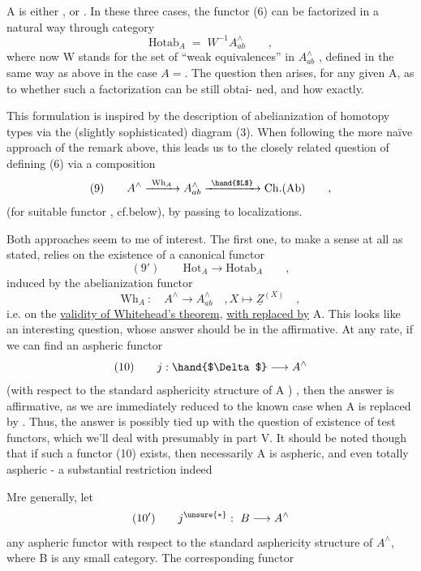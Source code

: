 
A  is either \hand{$\square$} , or \hand{$\bigcirc$} .  In these three cases,  the functor (6) can
be  factorized in a natural way through  category
\[ \mathrm{Hotab}_A \;=\; W^{-1}A^{\wedge}_{ab} \qquad , \]
where now W stands for the set of ``weak equivalences'' in  $A^{\wedge}_{ab}$ ,  defined
in the same way as above in the case $A=$\hand{$\Delta$}.  The question then arises,
for any given A,  as to whether such a factorization can be still obtai-%
ned,  and how exactly.

This formulation is inspired by the description of abelianization
of homotopy types via the (slightly sophisticated) diagram (3).  When
following the more naïve approach of the remark above,  this leads us to
the closely related question of defining (6)  via a composition
\[ (9) \qquad A^{\wedge} \xrightarrow{\ \mathrm{Wh}_A\ } A^{\wedge}_{ab} \xrightarrow{\ \hand{$L$}\ } \mathrm{Ch.(Ab)} \qquad , \]
(for suitable functor  , cf.below),  by passing to localizations.

Both approaches seem to me of interest.  The first one,  to make a
sense at all as stated,  relies on the existence of a canonical functor
\[ (9') \qquad \mathrm{Hot}_A \longrightarrow \mathrm{Hotab}_A \qquad , \]
induced by the abelianization functor
\[ \mathrm{Wh}_A \ : \quad A^{\wedge} \longrightarrow A^{\wedge}_{ab} \quad ,X \longmapsto \underline{Z}^{(X)} \quad , \]
i.e.  on the \uline{validity of Whitehead's theorem},  \uline{with \hand{$\Delta$} replaced by} A.
This looks like an interesting question,  whose answer should be in the
affirmative.  At any rate,  if we can find an aspheric functor
\[ (10) \qquad j: \hand{$\Delta$} \longrightarrow A^{\wedge} \]
(with respect to the standard asphericity structure of A )
  ,  then the answer is affirmative,  as we are
immediately reduced to the known case when A is replaced by \hand{$\Delta$}.  Thus,
the answer is possibly tied up with the question of existence of test
functors,  which we'll deal with presumably in part V.   It should be 
noted though that if such a functor (10) exists,  then necessarily A is
aspheric,  and even totally aspheric  -  a substantial restriction indeed\unsure{!}

Mre generally,  let
\[ (10') \qquad j^{\unsure{*}}: \ B \longrightarrow A^{\wedge} \]
any aspheric functor with respect to the standard asphericity structure
of $A^{\wedge}$, where B is any small category.     The corresponding functor

